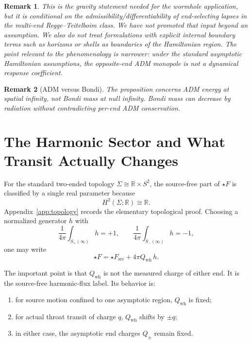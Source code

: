 \documentclass[aps,prd,onecolumn,nofootinbib,superscriptaddress]{revtex4-2}
\newtheorem{remark}{Remark}
\begin{document}
\begin{remark}
This is the gravity statement needed for the wormhole application, but it is conditional on the admissibility/differentiability of end-selecting lapses in the multi-end Regge--Teitelboim class. We have not promoted that input beyond an assumption. We also do not treat formulations with explicit internal boundary terms such as horizons or shells as boundaries of the Hamiltonian region. The point relevant to the phenomenology is narrower: under the standard asymptotic Hamiltonian assumptions, the opposite-end ADM monopole is not a dynamical response coefficient.
\end{remark}

\begin{remark}[ADM versus Bondi]
The proposition concerns ADM energy at spatial infinity, not Bondi mass at null infinity. Bondi mass can decrease by radiation without contradicting per-end ADM conservation.\cite{BondiVanderBurgMetzner1962Gravitational,Sachs1962Asymptotic}
\end{remark}

\section{The Harmonic Sector and What Transit Actually Changes}
\label{sec:topology}

For the standard two-ended topology $\Sigma\cong\mathbb{R}\times S^2$, the source-free part of $\star F$ is classified by a single real parameter because
\begin{equation}
H^2(\Sigma;\mathbb{R})\cong \mathbb{R}.
\end{equation}
Appendix~\ref{app:topology} records the elementary topological proof. Choosing a normalized generator $h$ with
\begin{equation}
\frac{1}{4\pi}\int_{S_+(\infty)} h = +1,
\qquad
\frac{1}{4\pi}\int_{S_-(\infty)} h = -1,
\end{equation}
one may write
\begin{equation}
\star F = \star F_{\mathrm{src}} + 4\pi Q_{\mathrm{wh}}\, h.
\end{equation}

The important point is that $Q_{\mathrm{wh}}$ is not the measured charge of either end. It is the source-free harmonic-flux label. Its behavior is:
\begin{enumerate}
    \item for source motion confined to one asymptotic region, $Q_{\mathrm{wh}}$ is fixed;
    \item for actual throat transit of charge $q$, $Q_{\mathrm{wh}}$ shifts by $\pm q$;
    \item in either case, the asymptotic end charges $Q_\pm$ remain fixed.
\end{enumerate}
\end{document}
